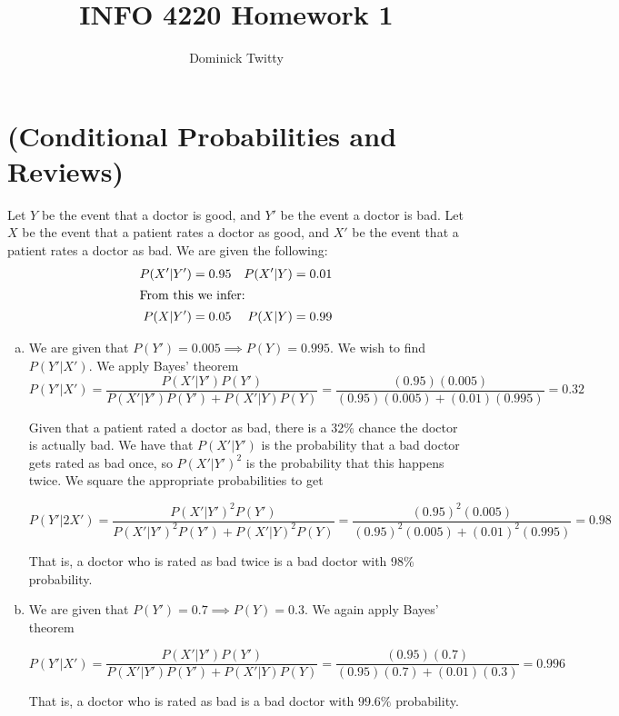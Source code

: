 \documentclass[12pt]{article}
\begin{document}
\title{INFO 4220 Homework 1}
\author{Dominick Twitty}
\maketitle

\section{(Conditional Probabilities and Reviews)}
Let $Y$ be the event that a doctor is good, and $Y'$ be the event a doctor is bad. Let $X$ be the event that a patient rates a doctor as good, and $X'$ be the event that a patient rates a doctor as bad.
We are given the following:
\begin{align*}
P(X' | Y') = 0.95 & & P(X' | Y) = 0.01\\
\shortintertext{From this we infer:}
P(X | Y') = 0.05 & & P(X | Y) = 0.99
\end{align*}

\begin{enumerate}[(a)]
\item We are given that $P(Y') = 0.005 \implies P(Y) = 0.995$. We wish to find $P(Y' |  X')$. We apply Bayes' theorem
$$P(Y' | X') = \frac{P(X' | Y')P(Y')}{P(X' | Y')P(Y') + P(X' | Y)P(Y)} = \frac{(0.95)(0.005)}{(0.95)(0.005) + (0.01)(0.995)} = 0.32$$

Given that a patient rated a doctor as bad, there is a 32\% chance the doctor is actually bad. We have that $P(X' | Y')$ is the probability that a bad doctor gets rated as bad once, so $P(X' | Y')^2$ is the probability that this happens twice. We square the appropriate probabilities to get

$$P(Y' | 2X') = \frac{P(X' | Y')^2P(Y')}{P(X' | Y')^2P(Y') + P(X' | Y)^2P(Y)} = \frac{(0.95)^2(0.005)}{(0.95)^2(0.005) + (0.01)^2(0.995)} = 0.98$$

That is, a doctor who is rated as bad twice is a bad doctor with 98\% probability.

\item We are given that $P(Y') = 0.7 \implies P(Y) = 0.3$. We again apply Bayes' theorem

$$P(Y' | X') = \frac{P(X' | Y')P(Y')}{P(X' | Y')P(Y') + P(X' | Y)P(Y)} = \frac{(0.95)(0.7)}{(0.95)(0.7) + (0.01)(0.3)} = 0.996$$

That is, a doctor who is rated as bad is a bad doctor with $99.6\%$ probability.

\end{enumerate}
\end{document}

